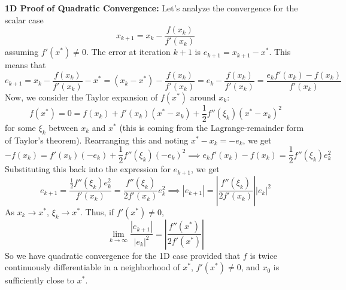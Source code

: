\textbf{1D Proof of Quadratic Convergence:}
Let's analyze the convergence for the scalar case 
\begin{equation}
x_{k+1} = x_k - \frac{f(x_k)}{f'(x_k)}
\end{equation}
 assuming $f'(x^*) \neq 0$. The error at iteration $k+1$ is $e_{k+1} = x_{k+1} - x^*$. This means that
\begin{equation}
    e_{k+1} = x_k - \frac{f(x_k)}{f'(x_k)} - x^* = (x_k - x^*) - \frac{f(x_k)}{f'(x_k)} = e_k - \frac{f(x_k)}{f'(x_k)}
    = \frac{e_k f'(x_k) - f(x_k)}{f'(x_k)}
\end{equation}
Now, we consider the Taylor expansion of $f(x^*)$ around $x_k$:
\begin{equation}
    f(x^*) = 0 = f(x_k) + f'(x_k)(x^* - x_k) + \frac{1}{2}f''(\xi_k)(x^* - x_k)^2
\end{equation}
for some $\xi_k$ between $x_k$ and $x^*$ (this is coming from the Lagrange-remainder form of Taylor's theorem). Rearranging this and noting $x^* - x_k = -e_k$, we get
\begin{equation}
    -f(x_k) = f'(x_k)(-e_k) + \frac{1}{2}f''(\xi_k)(-e_k)^2
    \implies
    e_k f'(x_k) - f(x_k) = \frac{1}{2}f''(\xi_k)e_k^2
\end{equation}
Substituting this back into the expression for $e_{k+1}$, we get
\begin{equation}
    e_{k+1} = \frac{\frac{1}{2}f''(\xi_k)e_k^2}{f'(x_k)} = \frac{f''(\xi_k)}{2f'(x_k)} e_k^2
    \implies
    |e_{k+1}| = \left| \frac{f''(\xi_k)}{2f'(x_k)} \right| |e_k|^2
\end{equation}
As $x_k \to x^*$, $\xi_k \to x^*$. Thus, if $f'(x^*) \neq 0$,
\begin{equation}
    \lim_{k\to\infty} \frac{|e_{k+1}|}{|e_k|^2} = \left| \frac{f''(x^*)}{2f'(x^*)} \right|
\end{equation}
So we have quadratic convergence for the 1D case provided that $f$ is twice continuously differentiable in a neighborhood of $x^*$, $f'(x^*) \neq 0$, and $x_0$ is sufficiently close to $x^*$.

